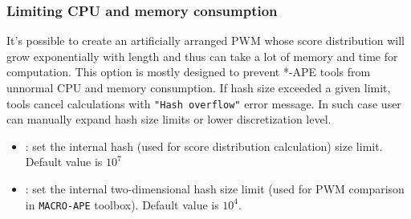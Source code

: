 \subsubsection{Limiting CPU and memory consumption}
It's possible to create an artificially arranged PWM whose score distribution
 will grow exponentially with length and thus can take a lot of memory and time for computation.
 This option is mostly designed to prevent *-APE tools from unnormal CPU and memory consumption.
 If hash size exceeded a given limit, tools cancel calculations with \texttt{"Hash overflow"} error message.
 In such case user can manually expand hash size limits or lower discretization level.
  \begin{itemize}
  \item {}: set the internal hash (used for score distribution calculation) size limit. Default value is $10^7$
  \item {}: set the internal two-dimensional hash size limit (used for PWM comparison in \texttt{MACRO-APE} toolbox). Default value is $10^4$.
  \end{itemize}

